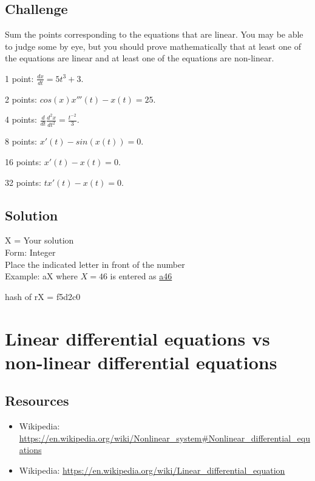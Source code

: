 \subsection*{Challenge}
Sum the points corresponding to the equations that are linear. You may be able to judge some by eye, but you should prove mathematically that at least one of the equations are linear and at least one of the equations are non-linear.

1 point: $\displaystyle \frac{dx}{dt} = 5t^3 + 3$.

2 points: $\displaystyle cos(x) x'''(t) - x(t) = 25$.

4 points: $\displaystyle \frac{d}{dt} \frac{d^2 x}{dt^2} = \frac{t^{-2}}{3}$.

8 points: $\displaystyle x'(t) - sin(x(t)) = 0$.

16 points: $\displaystyle x'(t) - x(t) = 0$.

32 points: $\displaystyle t x'(t) - x(t) = 0$.

\subsection*{Solution}
X = Your solution\\
Form: Integer\\
Place the indicated letter in front of the number\\
Example: aX where $X=46$ is entered as \href{http://www.wolframalpha.com/input/?i=md5+hash+of+\%22a46\%22}{a46}

hash of rX = f5d2c0




\newpage
\section{Linear differential equations vs non-linear differential equations}

\subsection*{Resources}
\begin{itemize}
    \item Wikipedia: \url{https://en.wikipedia.org/wiki/Nonlinear_system#Nonlinear_differential_equations}
    \item Wikipedia: \url{https://en.wikipedia.org/wiki/Linear_differential_equation}
\end{itemize}

